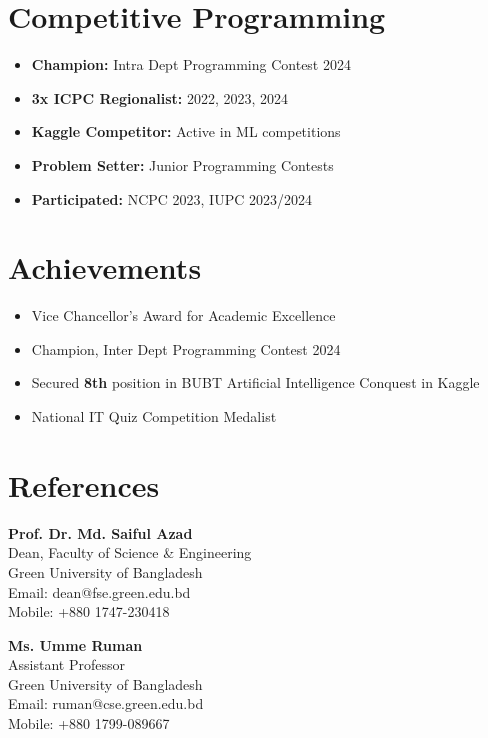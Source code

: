 \documentclass[letterpaper,11pt]{extarticle}
\begin{document}
\section{Competitive Programming}
\begin{itemize}[noitemsep, topsep=0pt]
    \item \textbf{Champion:} Intra Dept Programming Contest 2024
    \item \textbf{3x ICPC Regionalist:} 2022, 2023, 2024
    \item \textbf{Kaggle Competitor:} Active in ML competitions
    \item \textbf{Problem Setter:} Junior Programming Contests
    \item \textbf{Participated:} NCPC 2023, IUPC 2023/2024
\end{itemize}

\section{Achievements}
\begin{itemize}[noitemsep, topsep=0pt]
    \item Vice Chancellor's Award for Academic Excellence
    \item Champion, Inter Dept Programming Contest 2024
    \item Secured \textbf{8th} position in BUBT Artificial Intelligence Conquest in Kaggle
    \item National IT Quiz Competition Medalist
\end{itemize}

\section{References}
\textbf{Prof. Dr. Md. Saiful Azad} \\
Dean, Faculty of Science \& Engineering \\
Green University of Bangladesh \\
Email: dean@fse.green.edu.bd \\
Mobile: +880 1747-230418

\vspace{6pt}
\textbf{Ms. Umme Ruman} \\
Assistant Professor \\
Green University of Bangladesh \\
Email: ruman@cse.green.edu.bd \\
Mobile: +880 1799-089667
\end{document}
